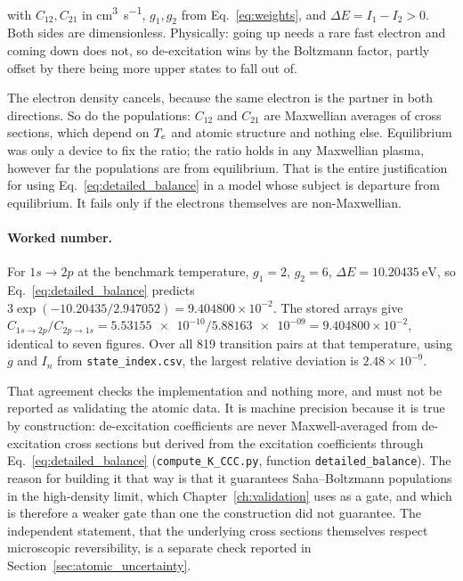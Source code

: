 \noindent with $C_{12},C_{21}$ in \si{\cubic\centi\metre\per\second}, $g_1,g_2$
from Eq.~\eqref{eq:weights}, and $\Delta E = I_1 - I_2 > 0$. Both sides are
dimensionless. Physically: going up needs a rare fast electron and coming down
does not, so de-excitation wins by the Boltzmann factor, partly offset by there
being more upper states to fall out of.

The electron density cancels, because the same electron is the partner in both
directions. So do the populations: $C_{12}$ and $C_{21}$ are Maxwellian averages
of cross sections, which depend on $T_e$ and atomic structure and nothing else.
Equilibrium was only a device to fix the ratio; the ratio holds in any
Maxwellian plasma, however far the populations are from equilibrium. That is the
entire justification for using Eq.~\eqref{eq:detailed_balance} in a model whose
subject is departure from equilibrium. It fails only if the electrons themselves
are non-Maxwellian.

\paragraph{Worked number.} For $1s \to 2p$ at the benchmark temperature,
$g_1 = 2$, $g_2 = 6$, $\Delta E = \SI{10.20435}{\electronvolt}$, so
Eq.~\eqref{eq:detailed_balance} predicts $3\exp(-10.20435/2.947052) =
9.404800\times10^{-2}$. The stored arrays give $C_{1s\to2p}/C_{2p\to1s} =
\num{5.53155e-10}/\num{5.88163e-09} = 9.404800\times10^{-2}$, identical to seven
figures. Over all 819 transition pairs at that temperature, using $g$ and $I_n$
from \texttt{state\_index.csv}, the largest relative deviation is
$2.48\times10^{-9}$.

That agreement checks the implementation and nothing more, and must not be
reported as validating the atomic data. It is machine precision because it is
true by construction: de-excitation coefficients are never Maxwell-averaged from
de-excitation cross sections but derived from the excitation coefficients
through Eq.~\eqref{eq:detailed_balance}
(\texttt{compute\_K\_CCC.py}, function \texttt{detailed\_balance}). The reason
for building it that way is that it guarantees Saha--Boltzmann populations in
the high-density limit, which Chapter~\ref{ch:validation} uses as a gate, and
which is therefore a weaker gate than one the construction did not guarantee.
The independent statement, that the underlying cross sections themselves respect
microscopic reversibility, is a separate check reported in
Section~\ref{sec:atomic_uncertainty}.

